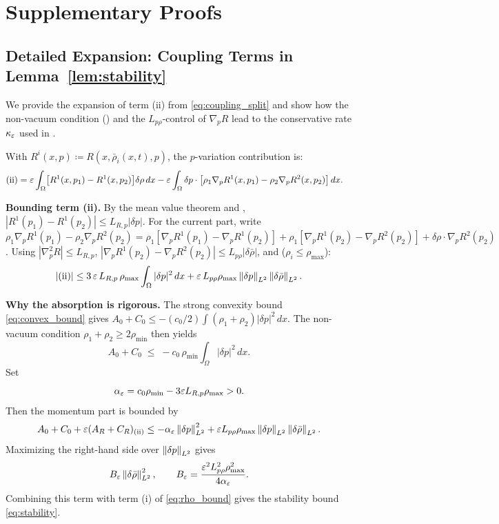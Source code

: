\section{Supplementary Proofs}
\label{app:proofs}

\subsection{Detailed Expansion: Coupling Terms in Lemma~\ref{lem:stability}}
\label{app:step5}

We provide the expansion of term (ii) from \eqref{eq:coupling_split} and show
how the non-vacuum condition () and the
\(L_{p\rho}\)-control of \(\nabla_pR\) lead to the conservative rate
\(\kappa_\varepsilon\) used in .

With $R^i(x,p) \coloneqq R(x,\bar\rho_i(x,t),p)$, the $p$-variation contribution is:
\begin{align*}
  \text{(ii)}
  &= \varepsilon\int_\Omega \bigl[R^1(x,p_1) - R^1(x,p_2)\bigr]\delta\rho\,dx
   - \varepsilon\int_\Omega \delta p\cdot\bigl[\rho_1\nabla_pR^1(x,p_1)
      - \rho_2\nabla_pR^2(x,p_2)\bigr]\,dx.
\end{align*}

\noindent\textbf{Bounding term (ii).}
By the mean value theorem and , $|R^1(p_1) - R^1(p_2)| \leq L_{R,p}|\delta p|$.
For the current part, write $\rho_1\nabla_pR^1(p_1) - \rho_2\nabla_pR^2(p_2) =
\rho_1[\nabla_pR^1(p_1)-\nabla_pR^1(p_2)] + \rho_1[\nabla_pR^1(p_2)-\nabla_pR^2(p_2)]
+ \delta\rho\cdot\nabla_pR^2(p_2)$.
Using $|\nabla_p^2 R| \leq L_{R,p}$,
$|\nabla_pR^1(p_2)-\nabla_pR^2(p_2)| \leq L_{p\rho}|\delta\bar\rho|$,
and  ($\rho_i \leq \rho_{\max}$):
\begin{equation}\label{eq:p_var_bound}
  |\text{(ii)}|
  \leq 3\,\varepsilon\,L_{R,p}\,\rho_{\max}\int_\Omega |\delta p|^2\,dx
  + \varepsilon\,L_{p\rho}\rho_{\max}
    \left\lVert \delta p \right\rVert_{L^2}\left\lVert \delta\bar\rho \right\rVert_{L^2}.
\end{equation}

\noindent\textbf{Why the absorption is rigorous.}
The strong convexity bound \eqref{eq:convex_bound} gives
$A_0+C_0 \leq -(c_0/2)\int(\rho_1+\rho_2)|\delta p|^2\,dx$.
The non-vacuum condition $\rho_1+\rho_2 \geq 2\rho_{\min}$ then yields
\[
  A_0+C_0 \;\leq\; -c_0\,\rho_{\min}\int_\Omega |\delta p|^2\,dx.
\]
Set
\[
  \alpha_\varepsilon=c_0\rho_{\min}-3\varepsilon L_{R,p}\rho_{\max}>0.
\]
Then the momentum part is bounded by
\[
  A_0+C_0+\varepsilon(A_R+C_R)_{\text{(ii)}}
  \leq -\alpha_\varepsilon\left\lVert \delta p \right\rVert_{L^2}^2
  + \varepsilon L_{p\rho}\rho_{\max}
    \left\lVert \delta p \right\rVert_{L^2}\left\lVert \delta\bar\rho \right\rVert_{L^2}.
\]
Maximizing the right-hand side over $\left\lVert \delta p \right\rVert_{L^2}$ gives
\[
  B_\varepsilon\left\lVert \delta\bar\rho \right\rVert_{L^2}^2,\qquad
  B_\varepsilon=\frac{\varepsilon^2L_{p\rho}^2\rho_{\max}^2}{4\alpha_\varepsilon}.
\]
Combining this term with term (i) of \eqref{eq:rho_bound} gives the stability
bound \eqref{eq:stability}.


